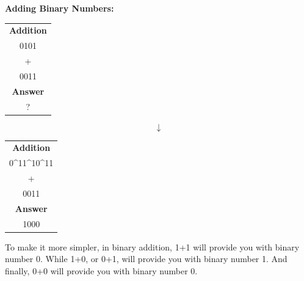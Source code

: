 \documentclass{article}
\begin{document}
\textbf{Adding Binary Numbers:}
\begin{table}[h!]
    \centering
    \begin{tabular}{|c|}
    \hline
        \textbf{Addition} \\
        0101  \\
        +  \\
        0011   \\
        \hline
               \textbf{Answer} \\
        ?  \\ 
        \hline
    \end{tabular}
    \label{tab:my_label}
\end{table}
$$\downarrow$$
\begin{table}[h!]
    \centering
    \begin{tabular}{|c|}
    \hline
        \textbf{Addition} \\
        0^11^10^11  \\
        +  \\
        0011   \\
        \hline
               \textbf{Answer} \\
        1000  \\ 
        \hline
    \end{tabular}
    \label{tab:my_label}
\end{table}
\newline
\newline
To make it more simpler, in binary addition, 1+1 will provide you with binary number 0. While 1+0, or 0+1, will provide you with binary number 1. And finally, 0+0 will provide you with binary number 0.
\end{document}
